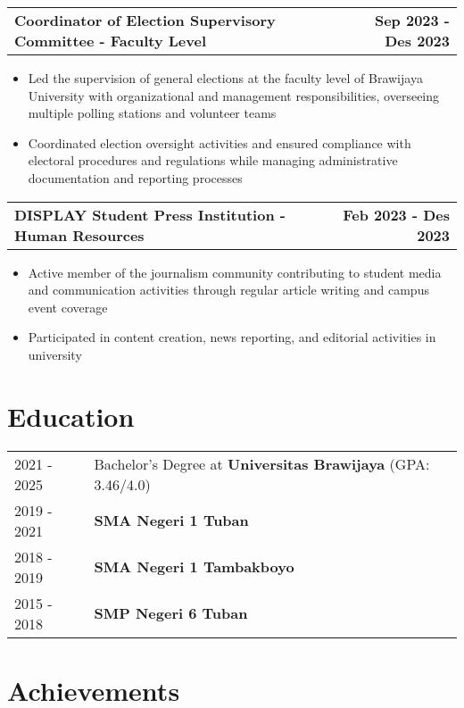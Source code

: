 \documentclass[a4paper,12pt]{article}
\makeatletter
\newenvironment{joblong}[2]
    {
    \begin{tabularx}{\linewidth}{@{}l X r@{}}
    \textbf{#1} & \hfill &  #2 \\[3.75pt]
    \end{tabularx}
    \begin{minipage}[t]{\linewidth}
    \begin{itemize}[nosep,after=\strut, leftmargin=1em, itemsep=3pt,label=--]
    }
    {
    \end{itemize}
    \end{minipage}    
    }
\makeatother
\begin{document}
\begin{joblong}{Coordinator of Election Supervisory Committee - Faculty Level}{\textbf{Sep 2023 - Des 2023}}
\item Led the supervision of general elections at the faculty level of Brawijaya University with organizational and management responsibilities, overseeing multiple polling stations and volunteer teams
\item Coordinated election oversight activities and ensured compliance with electoral procedures and regulations while managing administrative documentation and reporting processes
\end{joblong}

\begin{joblong}{DISPLAY Student Press Institution - Human Resources}{\textbf{Feb 2023 - Des 2023}}
\item Active member of the journalism community contributing to student media and communication activities through regular article writing and campus event coverage
\item Participated in content creation, news reporting, and editorial activities in university
\end{joblong}


\section{Education}
\begin{tabularx}{\linewidth}{@{}l X@{}}
2021 - 2025 & Bachelor's Degree at \textbf{Universitas Brawijaya} \hfill (GPA: 3.46/4.0) \\ 
2019 - 2021 & \textbf{SMA Negeri 1 Tuban} \\
2018 - 2019 & \textbf{SMA Negeri 1 Tambakboyo} \\
2015 - 2018 & \textbf{SMP Negeri 6 Tuban} \\
\end{tabularx}

\section{Achievements}
\hypersetup{hidelinks}
\end{document}
